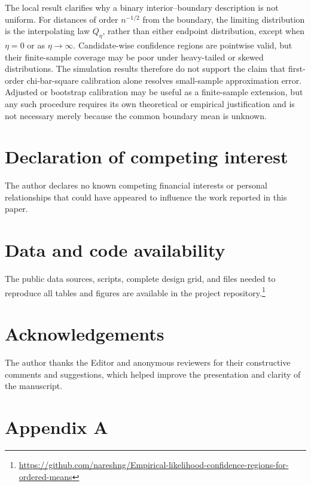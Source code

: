 \documentclass[11pt]{article}
\theoremstyle{remark}
\begin{document}
The local result clarifies why a binary interior--boundary description is not uniform. For distances of order $n^{-1/2}$ from the boundary, the limiting distribution is the interpolating law $Q_{\eta}$, rather than either endpoint distribution, except when $\eta=0$ or as $\eta\to\infty$. Candidate-wise confidence regions are pointwise valid, but their finite-sample coverage may be poor under heavy-tailed or skewed distributions. The simulation results therefore do not support the claim that first-order chi-bar-square calibration alone resolves small-sample approximation error. Adjusted or bootstrap calibration may be useful as a finite-sample extension, but any such procedure requires its own theoretical or empirical justification and is not necessary merely because the common boundary mean is unknown.



\section*{Declaration of competing interest}
The author declares no known competing financial interests or personal relationships that could have appeared to influence the work reported in this paper.

\section*{Data and code availability}

The public data sources, scripts, complete design grid, and files needed to reproduce all tables and figures are available in the project repository.\footnote{\url{https://github.com/nareshng/Empirical-likelihood-confidence-regions-for-ordered-means}}

\section*{Acknowledgements}

The author thanks the Editor and anonymous reviewers for their constructive comments and suggestions, which helped improve the presentation and clarity of the manuscript.





\section{\textbf{Appendix A}} \label{app:proofs}
\end{document}
